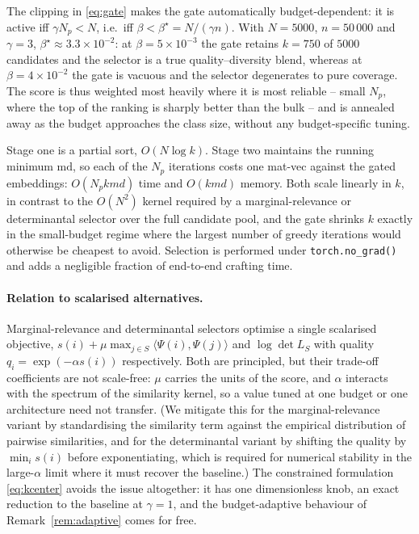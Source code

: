 \begin{remark}
\label{rem:adaptive}
The clipping in \eqref{eq:gate} makes the gate automatically budget-dependent:
it is active iff $\gamma N_p<N$, i.e.\ iff
$\beta<\beta^\star=N/(\gamma n)$.  With $N=5000$, $n=50\,000$ and $\gamma=3$,
$\beta^\star\approx3.3\times10^{-2}$: at $\beta=5\times10^{-3}$ the gate
retains $k=750$ of $5000$ candidates and the selector is a true
quality--diversity blend, whereas at $\beta=4\times10^{-2}$ the gate is
vacuous and the selector degenerates to pure coverage.  The score is thus
weighted most heavily where it is most reliable -- small $N_p$, where the
top of the ranking is sharply better than the bulk -- and is annealed away as
the budget approaches the class size, without any budget-specific tuning.
\end{remark}

\begin{remark}[Cost]
\label{rem:cost}
Stage one is a partial sort, $O(N\log k)$.  Stage two maintains the
running minimum $\mathrm{md}$, so each of the $N_p$ iterations costs one
mat-vec against the gated embeddings: $O(N_p k m d)$ time and $O(k m d)$
memory.  Both scale linearly in $k$, in contrast to the $O(N^2)$ kernel
required by a marginal-relevance or determinantal selector over the full
candidate pool, and the gate shrinks $k$ exactly in the small-budget regime
where the largest number of greedy iterations would otherwise be cheapest to
avoid.  Selection is performed under \texttt{torch.no\_grad()} and adds a
negligible fraction of end-to-end crafting time.
\end{remark}

\paragraph{Relation to scalarised alternatives.}
Marginal-relevance and determinantal selectors optimise a single scalarised
objective, $s(i)+\mu\max_{j\in S}\langle\Psi(i),\Psi(j)\rangle$ and
$\log\det L_S$ with quality $q_i=\exp(-\alpha s(i))$ respectively.  Both are
principled, but their trade-off coefficients are not scale-free: $\mu$ carries
the units of the score, and $\alpha$ interacts with the spectrum of the
similarity kernel, so a value tuned at one budget or one architecture need not
transfer.  (We mitigate this for the marginal-relevance variant by
standardising the similarity term against the empirical distribution of
pairwise similarities, and for the determinantal variant by shifting the
quality by $\min_i s(i)$ before exponentiating, which is required for
numerical stability in the large-$\alpha$ limit where it must recover the
baseline.)  The constrained formulation \eqref{eq:kcenter} avoids the issue
altogether: it has one dimensionless knob, an exact reduction to the baseline
at $\gamma=1$, and the budget-adaptive behaviour of
Remark~\ref{rem:adaptive} comes for free.
